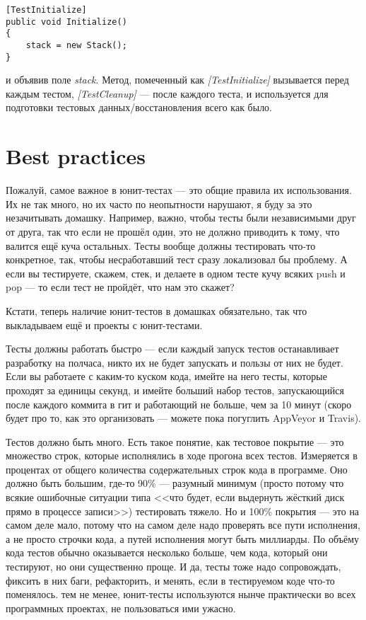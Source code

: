 \documentclass[a5paper]{article}
\begin{document}
\begin{verbatim}
[TestInitialize]
public void Initialize()
{
    stack = new Stack();
}
\end{verbatim}

и объявив поле \textit{stack}. Метод, помеченный как \textit{[TestInitialize]} вызывается перед каждым тестом, \textit{[TestCleanup]} --- после каждого теста, и используется для подготовки тестовых данных/восстановления всего как было. 

\section{Best practices}

Пожалуй, самое важное в юнит-тестах --- это общие правила их использования. Их не так много, но их часто по неопытности нарушают, я буду за это незачитывать домашку. Например, важно, чтобы тесты были независимыми друг от друга, так что если не прошёл один, это не должно приводить к тому, что валится ещё куча остальных. Тесты вообще должны тестировать что-то конкретное, так, чтобы несработавший тест сразу локализовал бы проблему. А если вы тестируете, скажем, стек, и делаете в одном тесте кучу всяких push и pop --- то если тест не пройдёт, что нам это скажет?

Кстати, теперь наличие юнит-тестов в домашках обязательно, так что выкладываем ещё и проекты с юнит-тестами.

Тесты должны работать быстро --- если каждый запуск тестов останавливает разработку на полчаса, никто их не будет запускать и пользы от них не будет. Если вы работаете с каким-то куском кода, имейте на него тесты, которые проходят за единицы секунд, и имейте больший набор тестов, запускающийся после каждого коммита в гит и работающий не больше, чем за 10 минут (скоро будет про то, как это организовать --- можете пока погуглить AppVeyor и Travis).

Тестов должно быть много. Есть такое понятие, как тестовое покрытие --- это множество строк, которые исполнялись в ходе прогона всех тестов. Измеряется в процентах от общего количества содержательных строк кода в программе. Оно должно быть большим, где-то 90\% --- разумный минимум (просто потому что всякие ошибочные ситуации типа <<что будет, если выдернуть жёсткий диск прямо в процессе записи>>) тестировать тяжело. Но и 100\% покрытия --- это на самом деле мало, потому что на самом деле надо проверять все пути исполнения, а не просто строчки кода, а путей исполнения могут быть миллиарды. По объёму кода тестов обычно оказывается несколько больше, чем кода, который они тестируют, но они существенно проще. И да, тесты тоже надо сопровождать, фиксить в них баги, рефакторить, и менять, если в тестируемом коде что-то поменялось. тем не менее, юнит-тесты используются нынче практически во всех программных проектах, не пользоваться ими ужасно.
\end{document}
